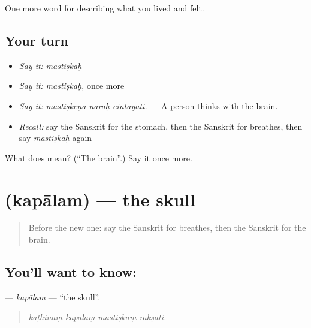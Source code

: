 \begin{grammarlens}[title={What you've built}]
One more word for describing what you lived and felt.
\end{grammarlens}

\subsection*{Your turn}
\begin{itemize}
\raggedright
  \item \emph{Say it:} \emph{mastiṣkaḥ}
  \item \emph{Say it:} \emph{mastiṣkaḥ}, once more
  \item \emph{Say it:} \emph{mastiṣkeṇa naraḥ cintayati.} — A person thinks with the brain.
  \item \emph{Recall:} say the Sanskrit for the stomach, then the Sanskrit for breathes, then say \emph{mastiṣkaḥ} again
\end{itemize}

\begin{tcolorbox}[breakable,colback=teal!4,colframe=teal!35!black,title={Before you move on}]
What does  mean? (\textquotedblleft{}The brain\textquotedblright{}.) Say it once more.
\end{tcolorbox}
\section[\texorpdfstring{\sk{कपालम्} (kapālam)}{कपालम् (kapālam)}]{ (kapālam) — the skull}

\label{lesson:SA-C471-kapalam}



\begin{quote}
Before the new one: say the Sanskrit for breathes, then the Sanskrit for the brain.
\end{quote}

\subsection*{You'll want to know: }
\textbf{} — \emph{kapālam} — \textquotedblleft{}the skull\textquotedblright{}.

\begin{quote}
   
\end{quote}

\begin{quote}
\emph{kaṭhinaṃ kapālaṃ mastiṣkaṃ rakṣati.}
\end{quote}

